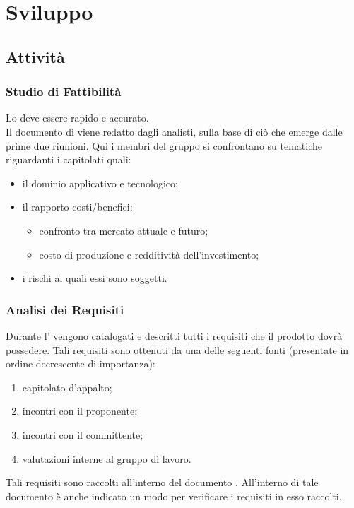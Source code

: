 \section{Sviluppo}
		\subsection{Attività}
			\subsubsection{Studio di Fattibilità}
				Lo  deve essere rapido e accurato.\\
				Il documento di  viene redatto dagli analisti, sulla base di ciò che emerge dalle prime due riunioni. Qui i membri del gruppo si confrontano su tematiche riguardanti i capitolati quali:
				\begin{itemize}
					\item il dominio applicativo e tecnologico;
					\item il rapporto costi/benefici:
					\begin{itemize}
						\item confronto tra mercato attuale e futuro;
						\item costo di produzione e redditività dell'investimento;
					\end{itemize}
					\item i rischi ai quali essi sono soggetti.
				\end{itemize}
			\subsubsection{Analisi dei Requisiti}
				Durante l' vengono catalogati e descritti tutti i requisiti che il prodotto dovrà possedere. Tali requisiti sono ottenuti da una delle seguenti fonti (presentate in ordine decrescente di importanza):
				\begin{enumerate}
					\item capitolato d’appalto;
					\item incontri con il proponente;
					\item incontri con il committente;
					\item valutazioni interne al gruppo di lavoro.
				\end{enumerate}
				Tali requisiti sono raccolti all'interno del documento . All'interno di tale documento è anche indicato un modo per verificare i requisiti in esso raccolti.
